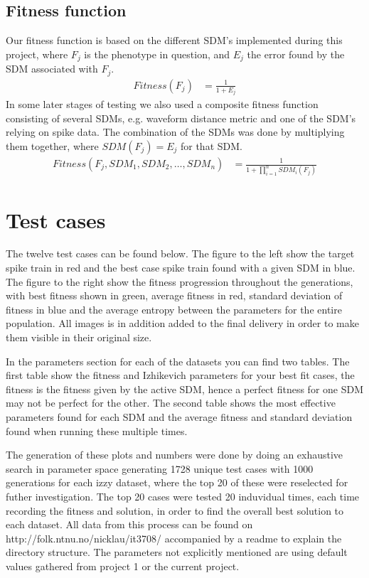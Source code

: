 \documentclass[10pt]{article}
\begin{document}
	\subsection{Fitness function}\label{sec:fitness}
		Our fitness function is based on the different SDM's implemented during this project, where $F_j$ is the phenotype in question, and $E_j$ the error found by the SDM associated with $F_j$.
		\begin{align}
			Fitness(F_j) &= \frac{1}{1+E_j}\nonumber
		\end{align}
		In some later stages of testing we also used a composite fitness function consisting of several SDMs, e.g. waveform distance metric and one of the SDM's relying on spike data. The combination of the SDMs was done by multiplying them together, where $SDM(F_j) = E_j$ for that SDM.
		\begin{align}
			Fitness(F_j, SDM_1, SDM_2, \ldots,SDM_n) &= \frac{1}{1+\prod_{i=1}^nSDM_i(F_j)}\nonumber
		\end{align}
\pagebreak
\section{Test cases}\label{sec:test}
	The twelve test cases can be found below. The figure to the left show the target spike train in red and the best case spike train found with a given SDM in blue. The figure to the right show the fitness progression throughout the generations, with best fitness shown in green, average fitness in red, standard deviation of fitness in blue and the average entropy between the parameters for the entire population. All images is in addition added to the final delivery in order to make them visible in their original size. 
	
	In the parameters section for each of the datasets you can find two tables. The first table show the fitness and Izhikevich parameters for your best fit cases, the fitness is the fitness given by the active SDM, hence a perfect fitness for one SDM may not be perfect for the other. The second table shows the most effective parameters found for each SDM and the average fitness and standard deviation found when running these multiple times. 
	
	The generation of these plots and numbers were done by doing an exhaustive search in parameter space generating 1728 unique test cases with 1000 generations for each izzy dataset, where the top 20 of these were reselected for futher investigation. The top 20 cases were tested 20 induvidual times, each time recording the fitness and solution, in order to find the overall best solution to each dataset. All data from this process can be found on http://folk.ntnu.no/nicklau/it3708/ accompanied by a readme to explain the directory structure. The parameters not explicitly mentioned are using default values gathered from project 1 or the current project.
	
\end{document}
